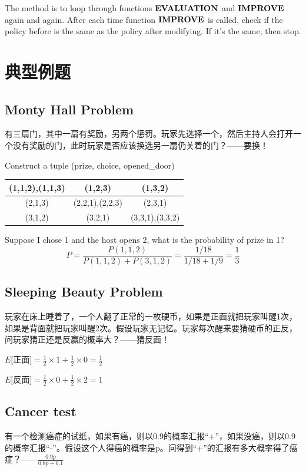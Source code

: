 \documentclass[12pt,a4paper]{ctexrep}
\begin{document}
The method is to loop through functions $\bold{EVALUATION}$ and $\bold{IMPROVE}$ again and again. After each time function $\bold{IMPROVE}$ is called, check if the policy before is the same as the policy after modifying. If it's the same, then stop.
\section{典型例题}
\subsection{Monty Hall Problem}
有三扇门，其中一扇有奖励，另两个惩罚。玩家先选择一个，然后主持人会打开一个没有奖励的门，此时玩家是否应该换选另一扇仍关着的门？——要换！

Construct a tuple (prize, choice, opened\_door)
\begin{center}
\begin{tabular}{|c|c|c|}
\hline
(1,1,2),(1,1,3) & (1,2,3) & (1,3,2)\\
\hline
(2,1,3) & (2,2,1),(2,2,3) & (2,3,1)\\
\hline
(3,1,2) & (3,2,1) & (3,3,1),(3,3,2)\\
\hline
\end{tabular}
\end{center}
Suppose I chose 1 and the host opens 2, what is the probability of prize in 1? \[P = \frac{P(1,1,2)}{P(1,1,2)+P(3,1,2)} = \frac{1/18}{1/18+1/9} = \frac{1}{3}\]
\subsection{Sleeping Beauty Problem}
玩家在床上睡着了，一个人翻了正常的一枚硬币，如果是正面就把玩家叫醒1次，如果是背面就把玩家叫醒2次。假设玩家无记忆。玩家每次醒来要猜硬币的正反，问玩家猜正还是反赢的概率大？——猜反面！

$E[$正面$] = \frac{1}{2}\times 1 + \frac{1}{2}\times 0 = \frac{1}{2}$

$E[$反面$] = \frac{1}{2}\times 0 + \frac{1}{2}\times 2 = 1$
\subsection{Cancer test}
有一个检测癌症的试纸，如果有癌，则以0.9的概率汇报“+”，如果没癌，则以0.9的概率汇报“-”。假设这个人得癌的概率是p。问得到“+”的汇报有多大概率得了癌症？——$\frac{0.9p}{0.8p+0.1}$
\end{document}
